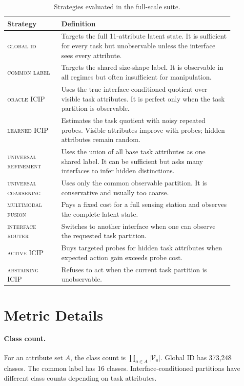 \documentclass{article}
\newcommand{\icip}{\textsc{ICIP}}
\newcommand{\method}[1]{\textsc{#1}}
\begin{document}
\begin{table}[h]
\centering
\caption{Strategies evaluated in the full-scale suite.}
\small
\begin{tabular}{p{0.22\linewidth}p{0.70\linewidth}}
\toprule
Strategy & Definition \\
\midrule
\method{global id} & Targets the full 11-attribute latent state. It is sufficient for every task but unobservable unless the interface sees every attribute. \\
\method{common label} & Targets the shared size-shape label. It is observable in all regimes but often insufficient for manipulation. \\
\method{oracle \icip} & Uses the true interface-conditioned quotient over visible task attributes. It is perfect only when the task partition is observable. \\
\method{learned \icip} & Estimates the task quotient with noisy repeated probes. Visible attributes improve with probes; hidden attributes remain random. \\
\method{universal refinement} & Uses the union of all base task attributes as one shared label. It can be sufficient but asks many interfaces to infer hidden distinctions. \\
\method{universal coarsening} & Uses only the common observable partition. It is conservative and usually too coarse. \\
\method{multimodal fusion} & Pays a fixed cost for a full sensing station and observes the complete latent state. \\
\method{interface router} & Switches to another interface when one can observe the requested task partition. \\
\method{active \icip} & Buys targeted probes for hidden task attributes when expected action gain exceeds probe cost. \\
\method{abstaining \icip} & Refuses to act when the current task partition is unobservable. \\
\bottomrule
\end{tabular}
\end{table}

\section{Metric Details}

\paragraph{Class count.}
For an attribute set $A$, the class count is $\prod_{a\in A}|\mathcal{V}_a|$.
Global ID has 373,248 classes.
The common label has 16 classes.
Interface-conditioned partitions have different class counts depending on task attributes.
\end{document}
